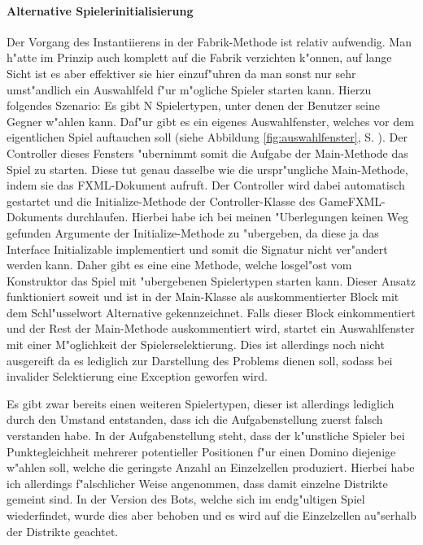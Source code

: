 \paragraph{Alternative Spielerinitialisierung}
\label{par:alternativeSpielerinitialisierung}
Der Vorgang des Instantiierens in der Fabrik-Methode ist relativ aufwendig. Man h"atte im Prinzip auch komplett auf die Fabrik verzichten k"onnen, auf lange Sicht ist es aber effektiver sie hier einzuf"uhren da man sonst nur sehr umst"andlich ein Auswahlfeld f"ur m"ogliche Spieler starten kann. Hierzu folgendes Szenario: Es gibt N Spielertypen, unter denen der Benutzer seine Gegner w"ahlen kann. Daf"ur gibt es ein eigenes Auswahlfenster, welches vor dem eigentlichen Spiel auftauchen soll (siehe Abbildung \ref{fig:auswahlfenster}, S. \pageref{fig:auswahlfenster}). Der Controller dieses Fensters "ubernimmt somit die Aufgabe der Main-Methode das Spiel zu starten. Diese tut genau dasselbe wie die urspr"ungliche Main-Methode, indem sie das FXML-Dokument aufruft. Der Controller wird dabei automatisch gestartet und die Initialize-Methode der Controller-Klasse des GameFXML-Dokuments durchlaufen. Hierbei habe ich bei meinen "Uberlegungen keinen Weg gefunden Argumente der Initialize-Methode zu "ubergeben, da diese ja das Interface Initializable implementiert und somit die Signatur nicht ver"andert werden kann. Daher gibt es eine eine Methode, welche losgel"ost vom Konstruktor das Spiel mit "ubergebenen Spielertypen starten kann. Dieser Ansatz funktioniert soweit und ist in der Main-Klasse als auskommentierter Block mit dem Schl"usselwort \glqq Alternative\grqq {} gekennzeichnet. Falls dieser Block einkommentiert und der Rest der Main-Methode auskommentiert wird, startet ein Auswahlfenster mit einer M"oglichkeit der Spielerselektierung. Dies ist allerdings noch nicht ausgereift da es lediglich zur Darstellung des Problems dienen soll, sodass bei invalider Selektierung eine Exception geworfen wird. 

Es gibt zwar bereits einen weiteren Spielertypen, dieser ist allerdings lediglich durch den Umstand entstanden, dass ich die Aufgabenstellung zuerst falsch verstanden habe. In der Aufgabenstellung steht, dass der k"unstliche Spieler bei Punktegleichheit mehrerer potentieller Positionen f"ur einen Domino diejenige w"ahlen soll, welche die geringste Anzahl an Einzelzellen produziert. Hierbei habe ich allerdings f"alschlicher Weise angenommen, dass damit einzelne Distrikte gemeint sind. In der Version des Bots, welche sich im endg"ultigen Spiel wiederfindet, wurde dies aber behoben und es wird auf die Einzelzellen au"serhalb der Distrikte geachtet. 

